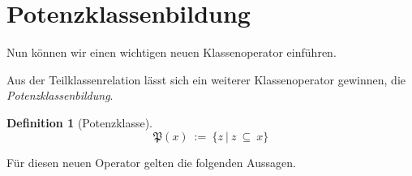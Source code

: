\documentclass[a4paper,german,10pt,twoside]{book}
\theoremstyle{definition}
\newtheorem{defn}[thm]{Definition}
\theoremstyle{remark}
\begin{document}
\section{Potenzklassenbildung} \label{chapter3_section5} \hypertarget{chapter3_section5}{}
Nun k{\"o}nnen wir einen wichtigen neuen Klassenoperator einf{\"u}hren.

\par
Aus der Teilklassenrelation l{\"a}sst sich ein weiterer Klassenoperator gewinnen, die \emph{Potenzklassenbildung}.

\begin{defn}[Potenzklasse]
\label{definition:power} \hypertarget{definition:power}{}
$$\mathfrak{P}(x)\ := \ \{ z \ | \ z \ \subseteq \ x \} $$

\end{defn}




\par
F{\"u}r diesen neuen Operator gelten die folgenden Aussagen.
\end{document}
